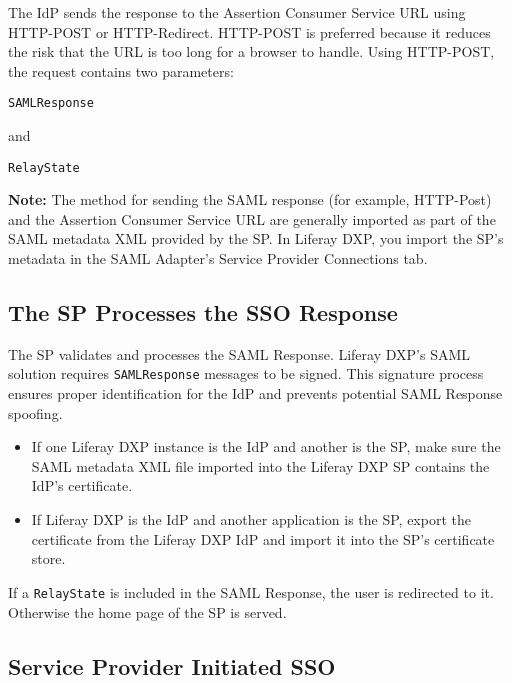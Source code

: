 The IdP sends the response to the Assertion Consumer Service URL using
HTTP-POST or HTTP-Redirect. HTTP-POST is preferred because it reduces
the risk that the URL is too long for a browser to handle. Using
HTTP-POST, the request contains two parameters:

\begin{verbatim}
SAMLResponse
\end{verbatim}

and

\begin{verbatim}
RelayState
\end{verbatim}

\noindent\hrulefill

\textbf{Note:} The method for sending the SAML response (for example,
HTTP-Post) and the Assertion Consumer Service URL are generally imported
as part of the SAML metadata XML provided by the SP. In Liferay DXP, you
import the SP's metadata in the SAML Adapter's Service Provider
Connections tab.

\noindent\hrulefill

\subsection{The SP Processes the SSO
Response}\label{the-sp-processes-the-sso-response}

The SP validates and processes the SAML Response. Liferay DXP's SAML
solution requires \texttt{SAMLResponse} messages to be signed. This
signature process ensures proper identification for the IdP and prevents
potential SAML Response spoofing.

\begin{itemize}
\tightlist
\item
  If one Liferay DXP instance is the IdP and another is the SP, make
  sure the SAML metadata XML file imported into the Liferay DXP SP
  contains the IdP's certificate.
\item
  If Liferay DXP is the IdP and another application is the SP, export
  the certificate from the Liferay DXP IdP and import it into the SP's
  certificate store.
\end{itemize}

If a \texttt{RelayState} is included in the SAML Response, the user is
redirected to it. Otherwise the home page of the SP is served.

\subsection{Service Provider Initiated
SSO}\label{service-provider-initiated-sso}

